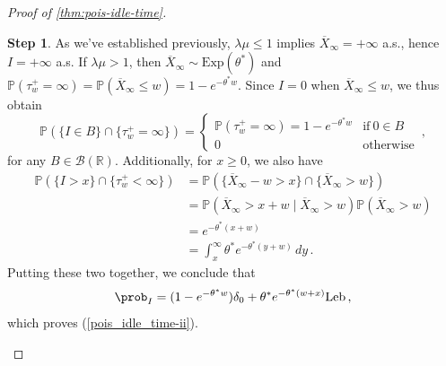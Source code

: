 \documentclass[titlepage]{article}
\theoremstyle{plain}
\theoremstyle{definition}
\newtheorem{proofpart}{Step}
\DeclareRobustCommand{\cprobX}[3][{\mathbb{P}}]{\ensuremath{ {#1}\left( {#2} \mid {#3}\right)}}
\DeclareRobustCommand{\probX}[2][{\mathbb{P}}]{\ensuremath{ {#1}\left( {#2} \right)}}
\begin{document}
\begin{proof}[Proof of \cref{thm:pois-idle-time}]
  \begin{proofpart}
    As we've established previously, $\lambda \mu \leq 1$ implies $\overline{X}_\infty = +\infty$ a.s., hence $I = +\infty$ a.s. If $\lambda \mu > 1$, then $\overline{X}_\infty \sim \mathrm{Exp}(\theta^*)$ and $\probX{\tau^+_w = \infty} = \probX{\overline{X}_\infty \leq w} = 1 - e^{-\theta^* w}$. Since $I = 0$ when $\overline{X}_\infty \leq w$, we thus obtain
    \begin{equation}
      \probX{\{ I \in B \} \cap \{ \tau^+_w = \infty \}} =
      \begin{cases}
        \probX{\tau^+_w = \infty} = 1 - e^{-\theta^* w} & \text{if} \ 0 \in B \\
        0                                               & \text{otherwise}
      \end{cases} \,,
    \end{equation}
    for any $B \in \mathcal{B}(\mathbb{R})$. Additionally, for $x \geq 0$, we also have
    \begin{align}
      \probX{\{ I > x \} \cap \{ \tau^+_w < \infty \}} & = \probX{\{ \overline{X}_\infty - w > x\} \cap \{ \overline{X}_\infty > w \}}                      \\
                                                       & = \cprobX{ \overline{X}_\infty > x + w }{\overline{X}_\infty > w } \probX{\overline{X}_\infty > w} \\
                                                       & = e^{-\theta^*{(x + w)}}                                                                           \\
                                                       & = \int_x^\infty \theta^* e^{-\theta^*{(y + w)}} \, dy
      \,.
    \end{align}
    Putting these two together, we conclude that
    \begin{equation}
      \prob_I = (1 - e^{-\theta^* w}) \delta_0 + \theta^* e^{-\theta^*{(w + x)}} \mathrm{Leb} \,,
    \end{equation}
    which proves (\ref{pois_idle_time-ii}).
  \end{proofpart}
\end{proof}
\end{document}

